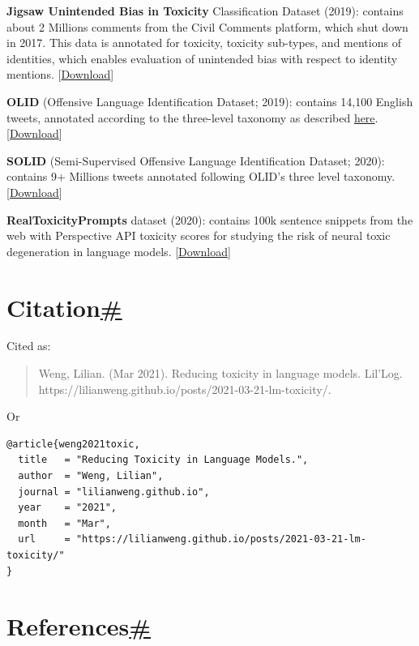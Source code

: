 \textbf{Jigsaw Unintended Bias in Toxicity} Classification Dataset (2019): contains about 2 Millions comments from the Civil Comments platform, which shut down in 2017. This data is annotated for toxicity, toxicity sub-types, and mentions of identities, which enables evaluation of unintended bias with respect to identity mentions. {[}\href{https://www.kaggle.com/c/jigsaw-unintended-bias-in-toxicity-classification}{Download}{]}

\label{OLID}{}\textbf{OLID} (Offensive Language Identification Dataset; 2019): contains 14,100 English tweets, annotated according to the three-level taxonomy as described \hyperref[categorization-of-toxic-content]{here}. {[}\href{https://sites.google.com/site/offensevalsharedtask/olid}{Download}{]}

\label{SOLID}{}\textbf{SOLID} (Semi-Supervised Offensive Language Identification Dataset; 2020): contains 9+ Millions tweets annotated following OLID's three level taxonomy. {[}\href{https://sites.google.com/site/offensevalsharedtask/solid}{Download}{]}

\label{RealToxicityPrompt}{}\textbf{RealToxicityPrompts} dataset (2020): contains 100k sentence snippets from the web with Perspective API toxicity scores for studying the risk of neural toxic degeneration in language models. {[}\href{https://allenai.org/data/real-toxicity-prompts}{Download}{]}

\section{\texorpdfstring{Citation\hyperref[citation]{\#}}{Citation\#}}\label{citation}

Cited as:

\begin{quote}
Weng, Lilian. (Mar 2021). Reducing toxicity in language models. Lil'Log. https://lilianweng.github.io/posts/2021-03-21-lm-toxicity/.
\end{quote}

Or

\begin{verbatim}
@article{weng2021toxic,
  title   = "Reducing Toxicity in Language Models.",
  author  = "Weng, Lilian",
  journal = "lilianweng.github.io",
  year    = "2021",
  month   = "Mar",
  url     = "https://lilianweng.github.io/posts/2021-03-21-lm-toxicity/"
}
\end{verbatim}

\section{\texorpdfstring{References\hyperref[references]{\#}}{References\#}}\label{references}

